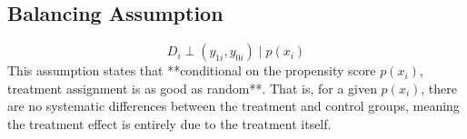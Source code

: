 \documentclass[10pt, oneside]{article}
\begin{document}
\subsection{Balancing Assumption}
\begin{equation}
D_i \perp (y_{1i}, y_{0i}) \mid p(x_i)
\end{equation}
This assumption states that **conditional on the propensity score $p(x_i)$, treatment assignment is as good as random**. That is, for a given $p(x_i)$, there are no systematic differences between the treatment and control groups, meaning the treatment effect is entirely due to the treatment itself.
\end{document}

